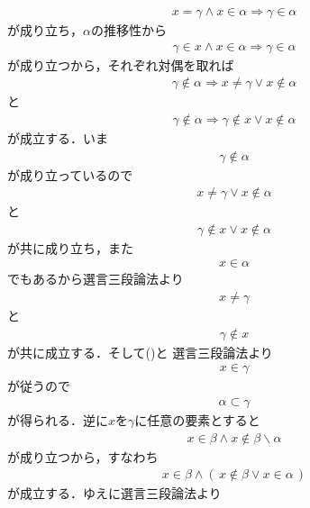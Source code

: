 \begin{prf}
		\begin{align}
			x = \gamma \wedge x \in \alpha \Longrightarrow \gamma \in \alpha
		\end{align}
		が成り立ち，$\alpha$の推移性から
		\begin{align}
			\gamma \in x \wedge x \in \alpha \Longrightarrow \gamma \in \alpha
		\end{align}
		が成り立つから，それぞれ対偶を取れば
		\begin{align}
			\gamma \notin \alpha \Longrightarrow x \neq \gamma \vee x \notin \alpha
		\end{align}
		と
		\begin{align}
			\gamma \notin \alpha \Longrightarrow \gamma \notin x \vee x \notin \alpha
		\end{align}
		が成立する．いま
		\begin{align}
			\gamma \notin \alpha
		\end{align}
		が成り立っているので
		\begin{align}
			x \neq \gamma \vee x \notin \alpha
		\end{align}
		と
		\begin{align}
			\gamma \notin x \vee x \notin \alpha
		\end{align}
		が共に成り立ち，また
		\begin{align}
			x \in \alpha
		\end{align}
		でもあるから選言三段論法より
		\begin{align}
			x \neq \gamma
		\end{align}
		と
		\begin{align}
			\gamma \notin x
		\end{align}
		が共に成立する．そして()と
		選言三段論法より
		\begin{align}
			x \in \gamma
		\end{align}
		が従うので
		\begin{align}
			\alpha \subset \gamma
		\end{align}
		が得られる．逆に$x$を$\gamma$に任意の要素とすると
		\begin{align}
			x \in \beta \wedge x \notin \beta \backslash \alpha
		\end{align}
		が成り立つから，すなわち
		\begin{align}
			x \in \beta \wedge (\, x \notin \beta \vee x \in \alpha\, )
		\end{align}
		が成立する．ゆえに選言三段論法より
		\begin{align}

\end{align}
\end{prf}
